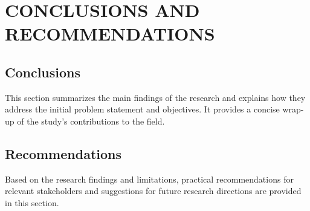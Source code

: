 \chapter{CONCLUSIONS AND RECOMMENDATIONS}

\section{Conclusions}
This section summarizes the main findings of the research and explains how they address the initial problem statement and objectives. It provides a concise wrap-up of the study's contributions to the field.

\section{Recommendations}
Based on the research findings and limitations, practical recommendations for relevant stakeholders and suggestions for future research directions are provided in this section.

